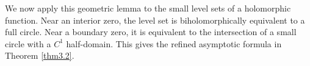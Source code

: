 \documentclass[12pt,twoside]{amsart}
\numberwithin{equation}{section}
\numberwithin{definition}{section} %
\begin{document}
%

		


We now apply this geometric lemma to the small level sets of a holomorphic function. Near an interior zero, the level set is biholomorphically equivalent to a full circle. Near a boundary zero, it is equivalent to the intersection of a small circle with a $C^1$ half-domain. This gives the refined asymptotic formula in Theorem \ref{thm3.2}.
\end{document}
